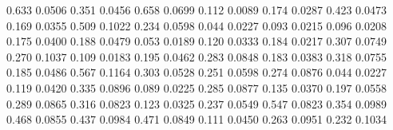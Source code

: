 0.633    0.0506 %
0.351    0.0456 %
0.658    0.0699 %
0.112    0.0089 %
0.174    0.0287 %
0.423    0.0473 %
0.169    0.0355 %
0.509    0.1022 %
0.234    0.0598 %
0.044    0.0227 %
0.093    0.0215 %
0.096    0.0208 %
0.175    0.0400 %
0.188    0.0479 %
0.053    0.0189 %
0.120    0.0333 %
0.184    0.0217 %
0.307    0.0749 %
0.270    0.1037 %
0.109    0.0183 %
0.195    0.0462 %
0.283    0.0848 %
0.183    0.0383 %
0.318    0.0755 %
0.185    0.0486 %
0.567    0.1164 %
0.303    0.0528 %
0.251    0.0598 %
0.274    0.0876 %
0.044    0.0227 %
0.119    0.0420 %
0.335    0.0896 %
0.089    0.0225 %
0.285    0.0877 %
0.135    0.0370 %
0.197    0.0558 %
0.289    0.0865 %
0.316    0.0823 %
0.123    0.0325 %
0.237    0.0549 %
0.547    0.0823 %
0.354    0.0989 %
0.468    0.0855 %
0.437    0.0984 %
0.471    0.0849 %
0.111    0.0450 %
0.263    0.0951 %
0.232    0.1034 %
